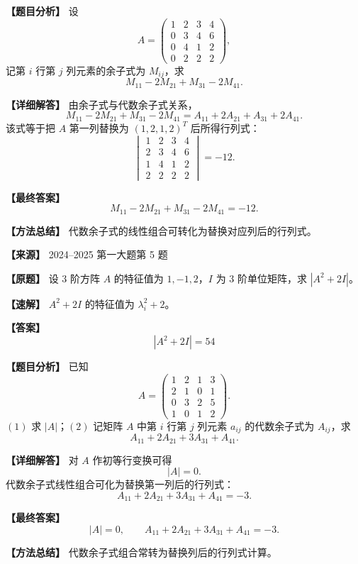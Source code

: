 \documentclass[11pt,a4paper,UTF8]{ctexart}
\begin{document}
\begin{answerbox}
\textbf{【题目分析】} 设
\[
A=\begin{pmatrix}1&2&3&4\\0&3&4&6\\0&4&1&2\\0&2&2&2\end{pmatrix},
\]
记第 $i$ 行第 $j$ 列元素的余子式为 $M_{ij}$，求
\[
M_{11}-2M_{21}+M_{31}-2M_{41}.
\]

\textbf{【详细解答】} 由余子式与代数余子式关系，
\[
M_{11}-2M_{21}+M_{31}-2M_{41}
=A_{11}+2A_{21}+A_{31}+2A_{41}.
\]
该式等于把 $A$ 第一列替换为 $(1,2,1,2)^T$ 后所得行列式：
\[
\begin{vmatrix}
1&2&3&4\\
2&3&4&6\\
1&4&1&2\\
2&2&2&2
\end{vmatrix}
=-12.
\]

\textbf{【最终答案】}
\[
M_{11}-2M_{21}+M_{31}-2M_{41}=-12.
\]

\textbf{【方法总结】} 代数余子式的线性组合可转化为替换对应列后的行列式。
\end{answerbox}

\begin{answerbox}
\textbf{【来源】} 2024--2025 第一大题第 5 题

\textbf{【原题】}
设 $3$ 阶方阵 $A$ 的特征值为 $1,-1,2$，$I$ 为 $3$ 阶单位矩阵，求 $|A^2+2I|$。

\textbf{【速解】}
$A^2+2I$ 的特征值为 $\lambda_i^2+2$。

\textbf{【答案】}
\[|A^2+2I|=54\]
\end{answerbox}

\begin{answerbox}
\textbf{【题目分析】} 已知
\[
A=\begin{pmatrix}1&2&1&3\\2&1&0&1\\0&3&2&5\\1&0&1&2\end{pmatrix}.
\]
$(1)$ 求 $|A|$；$(2)$ 记矩阵 $A$ 中第 $i$ 行第 $j$ 列元素 $a_{ij}$ 的代数余子式为 $A_{ij}$，求
\[
A_{11}+2A_{21}+3A_{31}+A_{41}.
\]

\textbf{【详细解答】} 对 $A$ 作初等行变换可得
\[
|A|=0.
\]
代数余子式线性组合可化为替换第一列后的行列式：
\[
A_{11}+2A_{21}+3A_{31}+A_{41}=-3.
\]

\textbf{【最终答案】}
\[
|A|=0,\qquad A_{11}+2A_{21}+3A_{31}+A_{41}=-3.
\]

\textbf{【方法总结】} 代数余子式组合常转为替换列后的行列式计算。
\end{answerbox}
\end{document}
